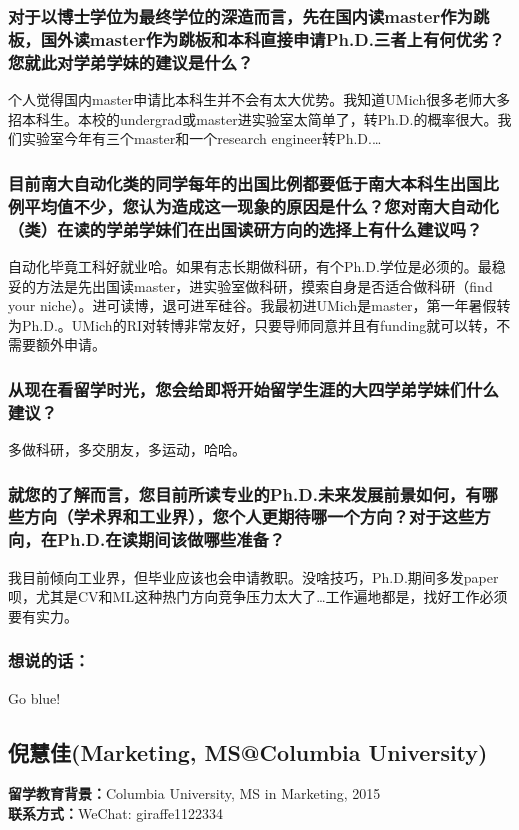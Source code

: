 \documentclass[a4paper,UTF8]{book}
\begin{document}
    \subsubsection*{对于以博士学位为最终学位的深造而言，先在国内读master作为跳板，国外读master作为跳板和本科直接申请Ph.D.三者上有何优劣？您就此对学弟学妹的建议是什么？}
    个人觉得国内master申请比本科生并不会有太大优势。我知道UMich很多老师大多招本科生。本校的undergrad或master进实验室太简单了，转Ph.D.的概率很大。我们实验室今年有三个master和一个research engineer转Ph.D.\dots

    \subsubsection*{目前南大自动化类的同学每年的出国比例都要低于南大本科生出国比例平均值不少，您认为造成这一现象的原因是什么？您对南大自动化（类）在读的学弟学妹们在出国读研方向的选择上有什么建议吗？}
    自动化毕竟工科好就业哈。如果有志长期做科研，有个Ph.D.学位是必须的。最稳妥的方法是先出国读master，进实验室做科研，摸索自身是否适合做科研（find your niche）。进可读博，退可进军硅谷。我最初进UMich是master，第一年暑假转为Ph.D.。UMich的RI对转博非常友好，只要导师同意并且有funding就可以转，不需要额外申请。

    \subsubsection*{从现在看留学时光，您会给即将开始留学生涯的大四学弟学妹们什么建议？}
    多做科研，多交朋友，多运动，哈哈。

    \subsubsection*{就您的了解而言，您目前所读专业的Ph.D.未来发展前景如何，有哪些方向（学术界和工业界），您个人更期待哪一个方向？对于这些方向，在Ph.D.在读期间该做哪些准备？}
    我目前倾向工业界，但毕业应该也会申请教职。没啥技巧，Ph.D.期间多发paper呗，尤其是CV和ML这种热门方向竞争压力太大了\dots 工作遍地都是，找好工作必须要有实力。
    
    \subsubsection{想说的话：}
    Go blue!


\clearpage
\subsection{倪慧佳(Marketing, MS@Columbia University)}
    \textbf{留学教育背景：}Columbia University, MS in Marketing, 2015\\
    \textbf{联系方式：}WeChat: giraffe1122334
\end{document}

